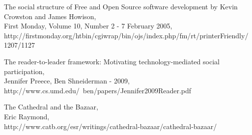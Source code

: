 \documentclass[11pt]{scrartcl}
\begin{document}
\begin{thebibliography}{9}
    The social structure of Free and Open Source software development by Kevin Crowston and James Howison,\\
    First Monday, Volume 10, Number 2 - 7 February 2005,\\
    http://firstmonday.org/htbin/cgiwrap/bin/ojs/index.php/fm/rt/printerFriendly/1207/1127
    
    The reader-to-leader framework: Motivating technology-mediated social participation,\\
    Jennifer Preece, Ben Shneiderman - 2009,\\
    http://www.cs.umd.edu/~ben/papers/Jennifer2009Reader.pdf
    
    The Cathedral and the Bazaar,\\
    Eric Raymond,\\
    http://www.catb.org/esr/writings/cathedral-bazaar/cathedral-bazaar/
\end{thebibliography}
\end{document}

